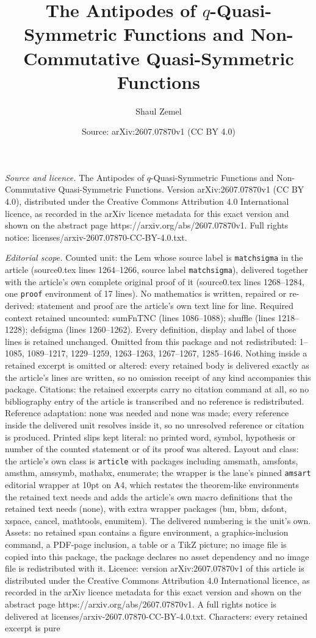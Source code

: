 \documentclass[10pt,a4paper]{amsart}
\title[The Antipodes of $q$-Quasi-Symmetric Functions and Non-Commu]{The Antipodes of $q$-Quasi-Symmetric Functions and Non-Commutative Quasi-Symmetric Functions}
\author{Shaul Zemel}
\date{Source: arXiv:2607.07870v1 (CC BY 4.0)}
\begin{document}
\maketitle

\noindent\emph{Source and licence.} The Antipodes of $q$-Quasi-Symmetric Functions and Non-Commutative Quasi-Symmetric Functions. Version arXiv:2607.07870v1 (CC BY 4.0), distributed under the Creative Commons Attribution 4.0 International licence, as recorded in the arXiv licence metadata for this exact version and shown on the abstract page https://arxiv.org/abs/2607.07870v1. Full rights notice: licenses/arxiv-2607.07870-CC-BY-4.0.txt.\par\smallskip

\noindent\textit{Editorial scope.} Counted unit: the Lem whose source label is \texttt{matchsigma} in the article (source0.tex lines 1264--1266, source label \texttt{matchsigma}), delivered together with the article's own complete original proof of it (source0.tex lines 1268--1284, one \texttt{proof} environment of 17 lines). No mathematics is written, repaired or re-derived: statement and proof are the article's own text line for line. Required context retained uncounted: sumFnTNC (lines 1086--1088); shuffle (lines 1218--1228); defsigma (lines 1260--1262). Every definition, display and label of those lines is retained unchanged. Omitted from this package and not redistributed: 1--1085, 1089--1217, 1229--1259, 1263--1263, 1267--1267, 1285--1646. Nothing inside a retained excerpt is omitted or altered: every retained body is delivered exactly as the article's lines are written, so no omission receipt of any kind accompanies this package. Citations: the retained excerpts carry no citation command at all, so no bibliography entry of the article is transcribed and no reference is redistributed. Reference adaptation: none was needed and none was made; every reference inside the delivered unit resolves inside it, so no unresolved reference or citation is produced. Printed slips kept literal: no printed word, symbol, hypothesis or number of the counted statement or of its proof was altered. Layout and class: the article's own class is \texttt{article} with packages including amsmath, amsfonts, amsthm, amssymb, mathabx, enumerate; the wrapper is the lane's pinned \texttt{amsart} editorial wrapper at 10pt on A4, which restates the theorem-like environments the retained text needs and adds the article's own macro definitions that the retained text needs (none), with extra wrapper packages (bm, bbm, dsfont, xspace, cancel, mathtools, enumitem). The delivered numbering is the unit's own. Assets: no retained span contains a figure environment, a graphics-inclusion command, a PDF-page inclusion, a table or a TikZ picture; no image file is copied into this package, the package declares no asset dependency and no image file is redistributed with it. Licence: version arXiv:2607.07870v1 of this article is distributed under the Creative Commons Attribution 4.0 International licence, as recorded in the arXiv licence metadata for this exact version and shown on the abstract page https://arxiv.org/abs/2607.07870v1. A full rights notice is delivered at licenses/arxiv-2607.07870-CC-BY-4.0.txt. Characters: every retained excerpt is pure 
\end{document}

